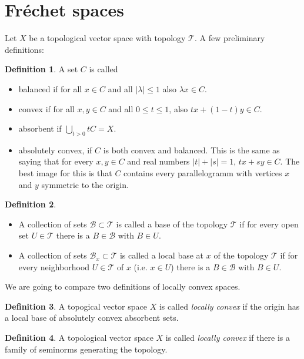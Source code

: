 \documentclass{scrartcl}
\theoremstyle{definition}
\newtheorem{definition}{Definition}
\theoremstyle{remark}
\newcommand{\Frechet}{Fr\'echet }
\newcommand{\T}{\mathcal T}
\begin{document}
\section{\Frechet spaces}
Let $X$ be a topological vector space with topology $\T$. A few preliminary definitions:
\begin{definition}
A set $C$ is called
\begin{itemize}
\item balanced if for all $x\in C$ and all $|\lambda| \leq 1$ also $\lambda x \in C$.
\item convex if for all $x, y\in C$ and all $0\leq t \leq 1$, also $tx+(1-t)y\in C$.
\item absorbent if $\bigcup_{t>0} tC = X$.
\item absolutely convex, if $C$ is both convex and balanced. This is the same as saying that for every $x,y\in C$ and real numbers $|t|+|s|=1$, $tx+sy \in C$. The best image for this is that $C$ contains every parallelogramm with vertices $x$ and $y$ symmetric to the origin.
\end{itemize} 
\end{definition}
\begin{definition}
\begin{itemize}
\item A collection of sets $\mathcal B \subset \T$ is called a base of the topology $\T$ if for every open set $U\in\T$ there is a $B\in \mathcal B$ with $B\in U$.
\item A collection of sets $\mathcal B_x \subset \T$ is called a local base at $x$ of the topology $\T$ if for every neighborhood $U\in\T$ of $x$ (i.e. $x\in U$) there is a $B\in \mathcal{ B}$ with $B\in U$.
\end{itemize}
\end{definition}

We are going to compare two definitions of locally convex spaces.

\begin{minipage}[t]{0.45\textwidth}
\begin{definition}\label{def:l1}
A topogical vector space $X$ is called \textit{locally convex} if the origin has a local base of absolutely convex absorbent sets.
\end{definition}
\end{minipage}
\hfill
\begin{minipage}[t]{0.45\textwidth}
\begin{definition}\label{def:l2}
A topological vector space $X$ is called \textit{locally convex} if there is a family of seminorms generating the topology.
\end{definition}
\end{minipage}
\end{document}
